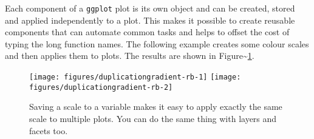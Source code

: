 \begin{Shaded}
\begin{Highlighting}[]
  \StringTok{ }
\StringTok{  }\NormalTok{(} \NormalTok{) +}
\StringTok{  }\NormalTok{(}\NormalTok{, }\NormalTok{) +}\StringTok{ }\NormalTok{(}\NormalTok{, }\NormalTok{)}
\end{Highlighting}
\end{Shaded}


Each component of a \texttt{ggplot} plot is its own object and can be
created, stored and applied independently to a plot. This makes it
possible to create reusable components that can automate common tasks
and helps to offset the cost of typing the long function names. The
following example creates some colour scales and then applies them to
plots. The results are shown in
Figure\textasciitilde{}\ref{fig:gradient-rb}. 

\begin{Shaded}
\begin{Highlighting}[]
\StringTok{ }\NormalTok{(} \NormalTok{, } \NormalTok{)}
  \StringTok{ }
  \NormalTok{) +}
\StringTok{  }
\end{Highlighting}
\end{Shaded}

\begin{figure}
\texttt{[image: figures/duplicationgradient-rb-1]} \texttt{[image: figures/duplicationgradient-rb-2]} \caption{Saving a scale to a variable makes it easy to apply exactly the same scale to multiple plots.  You can do the same thing with layers and facets too.\label{fig:gradient-rb}}
\end{figure}

